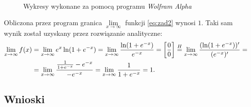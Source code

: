 \documentclass[11pt]{mk-polish-lab-report}
\let\times\relax%
\DeclareMathOperator{\times}{\cdot}
\begin{document}
\begin{figure}[h]
\centering
{}\hfill
{}\hfill
\caption{Wykresy wykonane za pomocą programu \emph{Wolfram Alpha}} \label{fig:zad2-wa}
\end{figure}
\noindent Obliczona przez program granica $\mathop {\lim }\limits_{x \to \infty}$ funkcji \eqref{eq:zad2} wynosi $1$. Taki sam wynik został uzyskany przez rozwiązanie analityczne:
\begin{equation}
\begin{aligned}
\mathop {\lim }\limits_{x \to \infty} f(x) &= \mathop {\lim }\limits_{x \to \infty} e^x \ln(1 + e^{-x}) = \mathop {\lim }\limits_{x \to \infty} \dfrac{\ln(1 + e^{-x})}{e^{-x}} = \left[\dfrac{0}{0}\right] \stackrel{H}{=} \mathop {\lim }\limits_{x \to \infty} \dfrac{(\ln(1 + e^{-x}))'}{(e^{-x})'} = \\ 
&= \mathop {\lim }\limits_{x \to \infty} \dfrac{\frac{1}{1 + e^{-x}}\times -e^{-x}}{-e^{-x}} = \mathop {\lim }\limits_{x \to \infty} \dfrac{1}{1 + e^{-x}} = 1. \nonumber
\end{aligned}
\end{equation}

\subsection{Wnioski}
\end{document}

